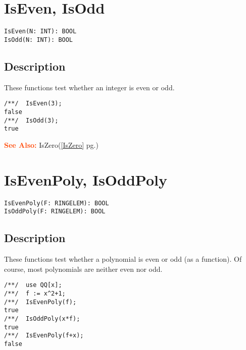 \documentclass[a4paper]{mybook}
\newenvironment{command}{}{} %
\newcommand\SeeAlso{\par\textcolor{OrangeRed}{\textbf{\large See Also: }}}
\begin{document}
\section{IsEven, IsOdd}
\label{IsEven, IsOdd}
\begin{command} %


\begin{Verbatim}[label=syntax, rulecolor=\color{MidnightBlue},
frame=single]
IsEven(N: INT): BOOL
IsOdd(N: INT): BOOL
\end{Verbatim}


\subsection*{Description}

These functions test whether an integer is even or odd.
\begin{Verbatim}[label=example, rulecolor=\color{PineGreen}, frame=single]
/**/  IsEven(3);
false
/**/  IsOdd(3);
true
\end{Verbatim}


\SeeAlso %
  IsZero(\ref{IsZero} pg.\pageref{IsZero})
\end{command} %

\section{IsEvenPoly, IsOddPoly}
\label{IsEvenPoly, IsOddPoly}
\begin{command} %


\begin{Verbatim}[label=syntax, rulecolor=\color{MidnightBlue},
frame=single]
IsEvenPoly(F: RINGELEM): BOOL
IsOddPoly(F: RINGELEM): BOOL
\end{Verbatim}


\subsection*{Description}

These functions test whether a polynomial is even or odd (as a function).
Of course, most polynomials are neither even nor odd.
\begin{Verbatim}[label=example, rulecolor=\color{PineGreen}, frame=single]
/**/  use QQ[x];
/**/  f := x^2+1;
/**/  IsEvenPoly(f);
true
/**/  IsOddPoly(x*f);
true
/**/  IsEvenPoly(f+x);
false
\end{Verbatim}


\end{command} %
\end{document}
